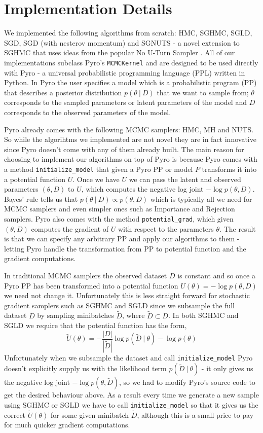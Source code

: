 
\section{Implementation Details}

We implemented the following algorithms from scratch: HMC, SGHMC, SGLD, SGD, SGD (with nesterov momentum) and SGNUTS - a novel extension to SGHMC that uses ideas from the popular No U-Turn Sampler \cite{nuts}.  All of our implementations subclass Pyro's \texttt{MCMCKernel} and are designed to be used directly with Pyro \cite{pyro} - a universal probabilistic programming language (PPL) written in Python. In Pyro the user specifies a model which is a probabilistic program (PP) that describes a posterior distribution $p(\theta \: | \: D)$ that we want to sample from; $\theta$ corresponds to the sampled parameters or latent parameters of the model and $D$ corresponds to the observed parameters of the model. 

Pyro already comes with the following MCMC samplers: HMC, MH and NUTS. So while the algorihtms we implemented are not novel they are in fact innovative since Pyro doesn't come with any of them already built. The main reason for choosing to implement our algorithms on top of Pyro is because Pyro comes with a method \texttt{initialize\_model} that given a Pyro PP or model $P$ transforms it into a potential function $U$. Once we have $U$ we can pass the latent and observed parameters $(\theta, D)$ to $U$, which computes the negative log joint $- \log p(\theta, D)$. Bayes' rule tells us that  $p(\theta \: | \: D) \propto p(\theta, D)$ which is typically all we need for MCMC samplers and even simpler ones such as Importance and Rejection samplers. Pyro also comes with the method \texttt{potential\_grad}, which given $(\theta, D)$ computes the gradient of $U$ with respect to the parameters $\theta$. The result is that we can specify any arbitrary PP and apply our algorithms to them - letting Pyro handle the transformation from PP to potential function and the gradient computations.

In traditional MCMC samplers the observed dataset $D$ is constant and so once a Pyro PP has been transformed into a potential function $U(\theta) = - \log p(\theta, D)$ we need not change it. Unfortunately this is less straight forward for stochastic gradient samplers such as SGHMC and SGLD since we subsample the full dataset $D$ by sampling minibatches $\tilde{D}$, where $\tilde{D} \subset D$. In both SGHMC and SGLD we require that the potential function has the form,
$$\tilde{U}(\theta) =  -\frac{|D|}{|\tilde{D}|} \log p(\tilde{D} \: | \: \theta) - \log p (\theta)$$
Unfortunately when we subsample the dataset and call \texttt{initialize\_model} Pyro doesn't explicitly supply us with the likelihood term $p(\tilde{D} \: | \: \theta)$ - it only gives us the negative log joint $- \log p(\theta, \tilde{D})$, so we had to modify Pyro's source code to get the desired behaviour above. As a result every time we generate a new sample using SGHMC or SGLD we have to call \texttt{initialize\_model} so that it gives us the correct $\tilde{U}(\theta)$ for some given minibatch $\tilde{D}$, although this is a small price to pay for much quicker gradient computations.